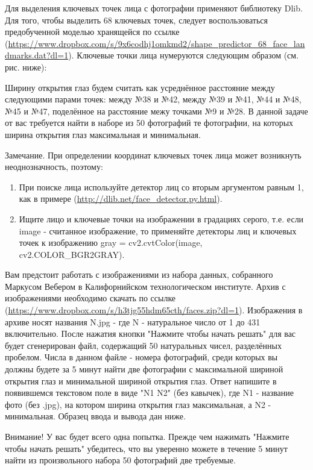 
Для выделения ключевых точек лица с фотографии применяют библиотеку Dlib. Для того, чтобы выделить 68 
ключевых точек, следует воспользоваться предобученной моделью хранящейся по ссылке (\url{https://www.dropbox.com/s/9x6codhj1omkmd2/shape_predictor_68_face_landmarks.dat?dl=1}). Ключевые точки лица нумеруются следующим образом (см. рис. ниже):


Ширину открытия глаз будем считать как усреднённое расстояние между следующими парами точек: между №38 и №42, между №39 и №41, №44 и №48, №45 и №47, поделённое на расстояние межу точками №9 и №28. В данной задаче от вас требуется найти в наборе из 50 фотографий те фотографии, на которых ширина открытия глаз максимальная и минимальная. 

Замечание. При определении координат ключевых точек лица может возникнуть неоднозначность, поэтому:

\begin{enumerate}
    \item При поиске лица используйте детектор лиц со вторым аргументом равным 1, как в примере (\url{http://dlib.net/face_detector.py.html}).
    \item Ищите лицо и ключевые точки на изображении в градациях серого, т.е. если image - считанное 
    изображение, то применяйте детекторы лиц и ключевых точек к изображению gray = cv2.cvtColor(image, cv2.COLOR\_BGR2GRAY).
\end{enumerate}

Вам предстоит работать с изображениями из набора данных, собранного Маркусом Вебером в Калифорнийском технологическом институте. Архив с изображениями необходимо скачать по ссылке (\url{https://www.dropbox.com/s/h3tjg55hdm65cth/faces.zip?dl=1}). Изображения в архиве носят названия N.jpg - где N - натуральное число от 1 до 431 включительно. После нажатия кнопки "Нажмите чтобы начать решать" для вас будет сгенерирован файл, содержащий 50 натуральных чисел, разделённых пробелом. Числа в данном файле - номера фотографий, среди которых вы должны будете за 5 минут найти две фотографии с максимальной шириной открытия глаз и минимальной шириной открытия глаз. Ответ напишите в появившемся текстовом поле в виде "N1 N2" (без кавычек), где N1 - название фото (без .jpg), на котором ширина открытия глаз максимальная, а N2 - минимальная. Образец ввода и вывода дан ниже.

Внимание! У вас будет всего одна попытка. Прежде чем нажимать "Нажмите чтобы начать решать" убедитесь, что вы уверенно можете в течение 5 минут найти из произвольного набора 50 фотографий две требуемые.

